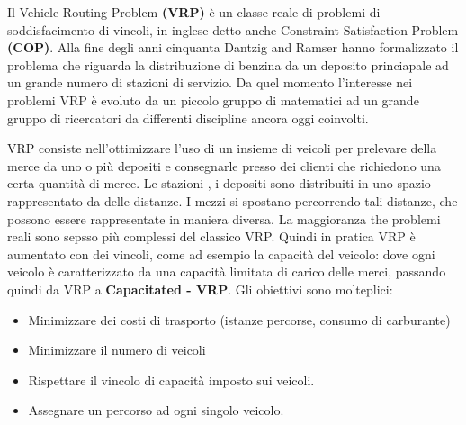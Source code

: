 \documentclass[]{article}
\begin{document}
Il Vehicle Routing Problem \textbf{(VRP)}  è un classe reale di problemi di soddisfacimento di vincoli, in inglese detto anche Constraint Satisfaction Problem \textbf{(COP)}.
Alla fine degli anni cinquanta Dantzig and Ramser hanno formalizzato il problema \cite{dispatching} che riguarda la distribuzione di benzina da un deposito princiapale ad un grande numero di stazioni di servizio.
Da quel momento l'interesse nei problemi VRP è evoluto da un piccolo gruppo di matematici ad un grande gruppo di ricercatori da differenti discipline ancora oggi coinvolti.


VRP consiste nell'ottimizzare l'uso di un insieme di veicoli per prelevare della merce da uno o più depositi e consegnarle presso dei clienti che richiedono una certa quantità di merce.
Le stazioni , i depositi sono distribuiti in uno spazio rappresentato da delle distanze. I mezzi si spostano percorrendo tali distanze, che possono essere rappresentate in maniera diversa.
La maggioranza the problemi reali sono sepsso più complessi del classico VRP. Quindi in pratica VRP è aumentato con dei vincoli, come ad esempio la capacità del veicolo: dove ogni veicolo è caratterizzato da una capacità limitata di carico delle merci, passando quindi da VRP a \textbf{Capacitated - VRP}.
Gli obiettivi sono molteplici:
\begin{itemize}
	\item Minimizzare dei costi di trasporto (istanze percorse, consumo di carburante)
	\item Minimizzare il numero di veicoli
	\item Rispettare il vincolo di capacità imposto  sui veicoli.
	\item Assegnare un percorso ad ogni singolo veicolo.
\end{itemize}
\end{document}
